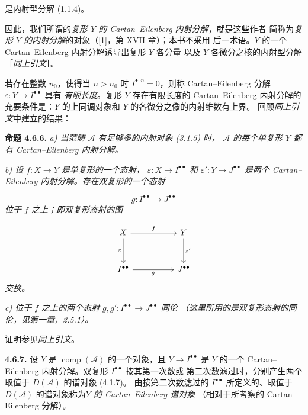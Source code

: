 \clearpage
{}%
\begingroup\small\setlength{\parskip}{0pt}\setlength{\emergencystretch}{1.5em}
\setlength{\abovedisplayskip}{4pt plus 2pt minus 2pt}%
\setlength{\belowdisplayskip}{4pt plus 2pt minus 2pt}%

\noindent 是内射型分解 (1.1.4)。

因此，我们所谓的\emph{复形 $Y$ 的 Cartan--Eilenberg 内射分解}，就是这些作者
简称为\emph{复形 $Y$ 的内射分解}的对象（[1]，第 XVII 章）；本书不采用
后一术语。$Y$ 的一个 Cartan--Eilenberg 内射分解诱导出复形 $Y$ 各分量
以及 $Y$ 各微分之核的内射型分解［\emph{同上引文}］。

若存在整数 $n_0$，使得当 $n>n_0$ 时 $I^{\bullet,n}=0$，则称
Cartan--Eilenberg 分解
$\varepsilon\colon Y\longrightarrow I^{\bullet\bullet}$ 具有
\emph{有限长度}。复形 $Y$ 存在有限长度的 Cartan--Eilenberg 内射分解的
充要条件是：$Y$ 的上同调对象和 $Y$ 的各微分之像的内射维数有上界。
回顾\emph{同上引文}中建立的结果：

\medskip\noindent\textbf{命题 4.6.6.}\quad
\textit{a) 当范畴 $\mathcal A$ 有足够多的内射对象 (3.1.5) 时，
$\mathcal A$ 的每个单复形 $Y$ 都有 Cartan--Eilenberg 内射分解。}

\noindent\textit{b) 设
$f\colon X\longrightarrow Y$ 是单复形的一个态射，
$\varepsilon\colon X\longrightarrow I^{\bullet\bullet}$ 和
$\varepsilon'\colon Y\longrightarrow J^{\bullet\bullet}$ 是两个
Cartan--Eilenberg 内射分解。存在双复形的一个态射}

\[
\textit{$g\colon I^{\bullet\bullet}\longrightarrow J^{\bullet\bullet}$}
\]
\textit{位于 $f$ 之上；即双复形态射的图}

\[
\begin{tikzcd}[column sep=5.0em,row sep=3.0em]
X \arrow[r,"f"] \arrow[d,"\varepsilon"'] &
Y \arrow[d,"\varepsilon'"] \\
I^{\bullet\bullet} \arrow[r,"g"'] &
J^{\bullet\bullet}
\end{tikzcd}
\]
\textit{交换。}

\noindent\textit{c) 位于 $f$ 之上的两个态射
$g,g'\colon I^{\bullet\bullet}\longrightarrow J^{\bullet\bullet}$ 同伦
（这里所用的是双复形态射的同伦，见第一章，2.5.1）。}

证明参见\emph{同上引文}。

\medskip\noindent\textbf{4.6.7.}\quad
设 $Y$ 是 $\operatorname{comp}(\mathcal A)$ 的一个对象，且
$Y\longrightarrow I^{\bullet\bullet}$ 是 $Y$ 的一个
Cartan--Eilenberg 内射分解。双复形 $I^{\bullet\bullet}$ 按其第一次数或
第二次数滤过时，分别产生两个取值于 $D(\mathcal A)$ 的谱对象 (4.1.7)。
由按第二次数滤过的 $I^{\bullet\bullet}$ 所定义的、取值于
$D(\mathcal A)$ 的谱对象称为\emph{$Y$ 的 Cartan--Eilenberg 谱对象}
（相对于所考察的 Cartan--Eilenberg 分解）。
\endgroup
